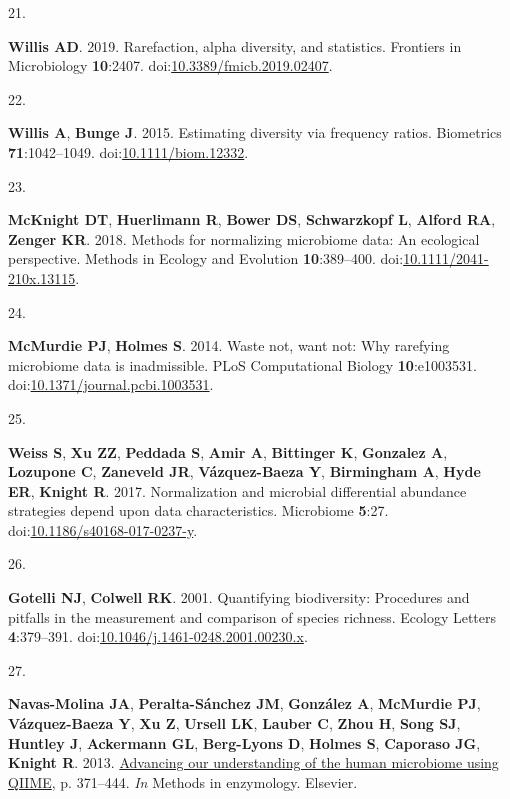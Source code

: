 \documentclass[
]{article}
\newlength{\cslhangindent}
\newlength{\csllabelwidth}
\newlength{\cslentryspacingunit} %
\newenvironment{CSLReferences}[2] %
 {%
  \setlength{\parindent}{0pt}
  \ifodd #1
  \let\oldpar\par
  \def\par{\hangindent=\cslhangindent\oldpar}
  \fi
  \setlength{\parskip}{#2\cslentryspacingunit}
 }%
 {}
\newcommand{\CSLLeftMargin}[1]{\parbox[t]{\csllabelwidth}{#1}}
\newcommand{\CSLRightInline}[1]{\parbox[t]{\linewidth - \csllabelwidth}{#1}\break}
\begin{document}
\begin{CSLReferences}{0}{1}
\leavevmode{}%
\CSLLeftMargin{21. }%
\CSLRightInline{\textbf{Willis AD}. 2019. Rarefaction, alpha diversity,
and statistics. Frontiers in Microbiology \textbf{10}:2407.
doi:\href{https://doi.org/10.3389/fmicb.2019.02407}{10.3389/fmicb.2019.02407}.}

\leavevmode{}%
\CSLLeftMargin{22. }%
\CSLRightInline{\textbf{Willis A}, \textbf{Bunge J}. 2015. Estimating
diversity via frequency ratios. Biometrics \textbf{71}:1042--1049.
doi:\href{https://doi.org/10.1111/biom.12332}{10.1111/biom.12332}.}

\leavevmode{}%
\CSLLeftMargin{23. }%
\CSLRightInline{\textbf{McKnight DT}, \textbf{Huerlimann R},
\textbf{Bower DS}, \textbf{Schwarzkopf L}, \textbf{Alford RA},
\textbf{Zenger KR}. 2018. Methods for normalizing microbiome data: An
ecological perspective. Methods in Ecology and Evolution
\textbf{10}:389--400.
doi:\href{https://doi.org/10.1111/2041-210x.13115}{10.1111/2041-210x.13115}.}

\leavevmode{}%
\CSLLeftMargin{24. }%
\CSLRightInline{\textbf{McMurdie PJ}, \textbf{Holmes S}. 2014. Waste
not, want not: Why rarefying microbiome data is inadmissible. {PLoS}
Computational Biology \textbf{10}:e1003531.
doi:\href{https://doi.org/10.1371/journal.pcbi.1003531}{10.1371/journal.pcbi.1003531}.}

\leavevmode{}%
\CSLLeftMargin{25. }%
\CSLRightInline{\textbf{Weiss S}, \textbf{Xu ZZ}, \textbf{Peddada S},
\textbf{Amir A}, \textbf{Bittinger K}, \textbf{Gonzalez A},
\textbf{Lozupone C}, \textbf{Zaneveld JR}, \textbf{Vázquez-Baeza Y},
\textbf{Birmingham A}, \textbf{Hyde ER}, \textbf{Knight R}. 2017.
Normalization and microbial differential abundance strategies depend
upon data characteristics. Microbiome \textbf{5}:27.
doi:\href{https://doi.org/10.1186/s40168-017-0237-y}{10.1186/s40168-017-0237-y}.}

\leavevmode{}%
\CSLLeftMargin{26. }%
\CSLRightInline{\textbf{Gotelli NJ}, \textbf{Colwell RK}. 2001.
Quantifying biodiversity: Procedures and pitfalls in the measurement and
comparison of species richness. Ecology Letters \textbf{4}:379--391.
doi:\href{https://doi.org/10.1046/j.1461-0248.2001.00230.x}{10.1046/j.1461-0248.2001.00230.x}.}

\leavevmode{}%
\CSLLeftMargin{27. }%
\CSLRightInline{\textbf{Navas-Molina JA}, \textbf{Peralta-Sánchez JM},
\textbf{González A}, \textbf{McMurdie PJ}, \textbf{Vázquez-Baeza Y},
\textbf{Xu Z}, \textbf{Ursell LK}, \textbf{Lauber C}, \textbf{Zhou H},
\textbf{Song SJ}, \textbf{Huntley J}, \textbf{Ackermann GL},
\textbf{Berg-Lyons D}, \textbf{Holmes S}, \textbf{Caporaso JG},
\textbf{Knight R}. 2013.
\href{https://doi.org/10.1016/b978-0-12-407863-5.00019-8}{Advancing our
understanding of the human microbiome using {QIIME}}, p. 371--444.
\emph{In} Methods in enzymology. Elsevier.}


\end{CSLReferences}
\end{document}
